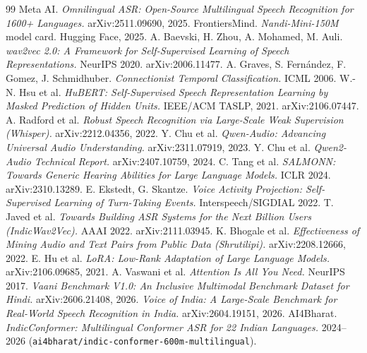 \documentclass[11pt]{article}
\newcommand{\code}[1]{\texttt{#1}}
\begin{document}
\begin{thebibliography}{99}
 Meta AI. \emph{Omnilingual ASR: Open-Source Multilingual Speech Recognition for
1600+ Languages.} arXiv:2511.09690, 2025.
 FrontiersMind. \emph{Nandi-Mini-150M} model card. Hugging Face, 2025.
 A. Baevski, H. Zhou, A. Mohamed, M. Auli. \emph{wav2vec 2.0: A Framework for
Self-Supervised Learning of Speech Representations.} NeurIPS 2020. arXiv:2006.11477.
 A. Graves, S. Fern\'andez, F. Gomez, J. Schmidhuber. \emph{Connectionist Temporal
Classification.} ICML 2006.
 W.-N. Hsu et al. \emph{HuBERT: Self-Supervised Speech Representation Learning by
Masked Prediction of Hidden Units.} IEEE/ACM TASLP, 2021. arXiv:2106.07447.
 A. Radford et al. \emph{Robust Speech Recognition via Large-Scale Weak
Supervision (Whisper).} arXiv:2212.04356, 2022.
 Y. Chu et al. \emph{Qwen-Audio: Advancing Universal Audio Understanding.}
arXiv:2311.07919, 2023.
 Y. Chu et al. \emph{Qwen2-Audio Technical Report.} arXiv:2407.10759, 2024.
 C. Tang et al. \emph{SALMONN: Towards Generic Hearing Abilities for Large
Language Models.} ICLR 2024. arXiv:2310.13289.
 E. Ekstedt, G. Skantze. \emph{Voice Activity Projection: Self-Supervised Learning
of Turn-Taking Events.} Interspeech/SIGDIAL 2022.
 T. Javed et al. \emph{Towards Building ASR Systems for the Next Billion Users
(IndicWav2Vec).} AAAI 2022. arXiv:2111.03945.
 K. Bhogale et al. \emph{Effectiveness of Mining Audio and Text Pairs from
Public Data (Shrutilipi).} arXiv:2208.12666, 2022.
 E. Hu et al. \emph{LoRA: Low-Rank Adaptation of Large Language Models.}
arXiv:2106.09685, 2021.
 A. Vaswani et al. \emph{Attention Is All You Need.} NeurIPS 2017.
 \emph{Vaani Benchmark V1.0: An Inclusive Multimodal Benchmark Dataset for
Hindi.} arXiv:2606.21408, 2026.
 \emph{Voice of India: A Large-Scale Benchmark for Real-World Speech Recognition
in India.} arXiv:2604.19151, 2026.
 AI4Bharat. \emph{IndicConformer: Multilingual Conformer ASR for 22 Indian
Languages.} 2024--2026 (\code{ai4bharat/indic-conformer-600m-multilingual}).
\end{thebibliography}
\end{document}
